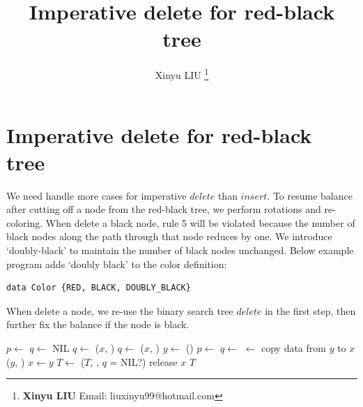 \documentclass[b5paper]{article}
\begin{document}
\title{Imperative delete for red-black tree}

\author{Xinyu LIU
\thanks{{\bfseries Xinyu LIU} \newline
  Email: liuxinyu99@hotmail.com \newline}
  }

\maketitle
\fi


\ifx\wholebook\relax
\chapter{Imperative delete for red-black tree}
\fi


We need handle more cases for imperative $delete$ than $insert$. To resume balance after cutting off a node from the red-black tree, we perform rotations and re-coloring. When delete a black node, rule 5 will be violated because the number of black nodes along the path through that node reduces by one. We introduce `doubly-black' to maintain the number of black nodes unchanged. Below example program adds `doubly black' to the color definition:

\lstset{frame = single}
\begin{lstlisting}[language = Bourbaki]
data Color {RED, BLACK, DOUBLY_BLACK}
\end{lstlisting}

When delete a node, we re-use the binary search tree $delete$ in the first step, then further fix the balance if the node is black.

\begin{algorithmic}[1]
  \State $p \gets$ 
  \State $q \gets$ NIL
    \State $q \gets$ 
    \State {}($x$, ) 
    \State $q \gets$ 
    \State {}($x$, ) 
  \Else
    \State $y \gets$ ()
    \State $p \gets$ 
    \State $q \gets$ 
    \State {} $\gets$ 
    \State copy data from $y$ to $x$
    \State {}($y$, ) 
    \State $x \gets y$
  \EndIf
    \State $T \gets$ ($T$, , $q$ = NIL?)
  \EndIf
  \State release $x$
  \State \Return $T$
\EndFunction
\end{algorithmic}
\end{document}
